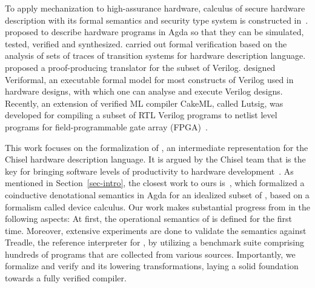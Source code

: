 To apply mechanization to high-assurance hardware, calculus of secure hardware description with its formal semantics and security type system is constructed in~\cite{Reynolds19}. 
\cite{FlorSS15} proposed to describe  hardware programs in Agda so that they can be simulated, tested, verified and synthesized.
\cite{Gordon02} carried out formal verification based on the analysis of sets of traces of transition systems for hardware description language.
\cite{Loow19} proposed a proof-producing translator for the subset of Verilog.
\cite{Khan17} designed Veriformal, an executable formal model for most constructs of Verilog used in hardware designs,
with which one can analyse and execute Verilog designs.
Recently, an extension of verified ML compiler CakeML, called Lutsig, was developed for compiling a subset of RTL Verilog programs to netlist level programs for field-programmable gate array (FPGA)~\cite{Loow21,loowphd21}. 

This work focuses on the formalization of {\firrtl}, an intermediate representation for the Chisel hardware description language.
It is argued by the Chisel team that {\firrtl} is the key for bringing software levels of productivity to hardware
development~\cite{firrtl-spec}.
As mentioned in Section~\ref{sec-intro}, the closest work to ours is~\cite{HarrisonHA21}, which formalized a coinductive denotational semantics in Agda for an idealized subset of {\lofirrtl}, based on a formalism called device calculus. Our work makes substantial progress from \cite{HarrisonHA21} in the following aspects:  At first, the operational semantics  of {\lofirrtl} is defined for the first time. Moreover, extensive experiments are done to validate the semantics against Treadle, the reference interpreter for {\lofirrtl},  by utilizing a benchmark suite comprising hundreds of programs that are collected from various sources. Importantly, we formalize and verify {\hifirrtl} and its lowering transformations, laying a solid foundation towards a fully verified {\firrtl} compiler. 


